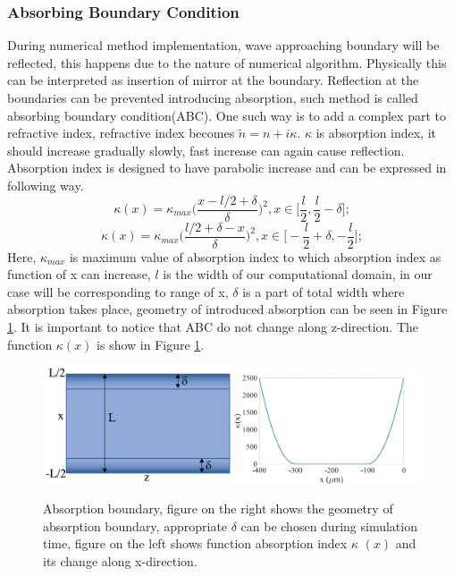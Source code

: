 \documentclass[a4paper]{article}
\begin{document}
	\subsubsection{Absorbing Boundary Condition}
	During numerical method implementation, wave approaching boundary will be reflected, this happens due to the nature of numerical algorithm. Physically this can be interpreted as insertion of mirror at the boundary. Reflection at the boundaries can be prevented introducing absorption, such method is called absorbing boundary condition(ABC). One such way is to add a complex part to refractive index, refractive index becomes $\tilde{n} = n+i\kappa$. $\kappa$  is absorption index, it should increase gradually slowly, fast increase can again cause reflection. Absorption index is designed to have parabolic increase and can be expressed in following way.
	\[\kappa(x)=\kappa_{max}\bigg(\frac{x-l/2+\delta}{\delta}\bigg)^2, x\in \bigg[\frac{l}{2},\frac{l}{2}-\delta\bigg];\]
	\[\kappa(x)=\kappa_{max}\bigg(\frac{l/2+\delta-x}{\delta}\bigg)^2, x\in \bigg[-\frac{l}{2}+\delta,-\frac{l}{2}\bigg];\]
	Here, $\kappa_{max}$ is maximum value of absorption index to which absorption index as function of x can increase, $l$ is the width of our computational domain, in our case will be corresponding to range of x, $\delta$ is a part of total width where absorption takes place, geometry of introduced absorption can be seen in Figure \ref{fig:Absorption}. It is important to notice that ABC do not change along z-direction. The function $\kappa (x)$ is show in Figure \ref{fig:Absorption}\cite{pedrola2015beam}.
	\begin{figure}[h!]
		\centering 
		\includegraphics[width=0.5\textwidth]{sketchN1.png}\includegraphics[width=0.5\textwidth]{N2.jpg}
		\caption{\label{fig:Absorption}Absorption boundary, figure on the right shows the geometry of absorption boundary, appropriate $\delta$ can be chosen during simulation time, figure on the left shows function absorption index $\kappa$ $ (x) $ and its change along x-direction.}
	\end{figure}
\end{document}
